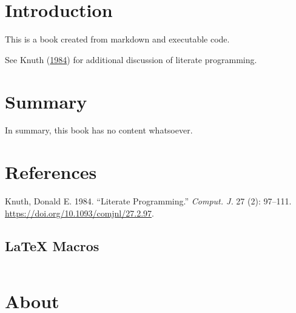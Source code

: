\documentclass[
  letterpaper,
  DIV=11,
  numbers=noendperiod]{scrreprt}
\newlength{\cslhangindent}
\newlength{\cslentryspacingunit} %
\newenvironment{CSLReferences}[2] %
 {%
  \setlength{\parindent}{0pt}
  \ifodd #1
  \let\oldpar\par
  \def\par{\hangindent=\cslhangindent\oldpar}
  \fi
  \setlength{\parskip}{#2\cslentryspacingunit}
 }%
 {}
\begin{document}
\hypertarget{introduction}{%
\chapter{Introduction}\label{introduction}}

This is a book created from markdown and executable code.

See Knuth (\protect\hyperlink{ref-knuth84}{1984}) for additional
discussion of literate programming.


\hypertarget{summary}{%
\chapter{Summary}\label{summary}}

In summary, this book has no content whatsoever.


\hypertarget{references}{%
\chapter*{References}\label{references}}


\hypertarget{refs}{}
\begin{CSLReferences}{1}{0}
\leavevmode{}%
Knuth, Donald E. 1984. {``Literate Programming.''} \emph{Comput. J.} 27
(2): 97--111. \url{https://doi.org/10.1093/comjnl/27.2.97}.

\end{CSLReferences}

\hypertarget{latex-macros}{%
\section*{LaTeX Macros}\label{latex-macros}}


\leavevmode{}%
\[\newcommand{\argmin}{\operatorname*{argmin}}\]
\[\newcommand{\argmax}{\operatorname*{argmax}}\]


\hypertarget{about}{%
\chapter{About}\label{about}}
\end{document}
